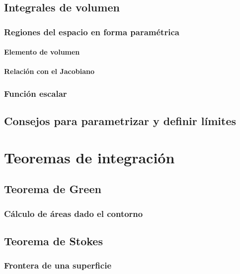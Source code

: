 \documentclass[12pt, fleqn]{report}                             %
\begin{document}
		\section{Integrales de volumen}
		
			\subsection{Regiones del espacio en forma paramétrica}
			
				\subsubsection{Elemento de volumen}
				
				\subsubsection{Relación con el Jacobiano}
		
			\subsection{Función escalar}
			
		\section{Consejos para parametrizar y definir límites}
	
	\chapter{Teoremas de integración}
	
		\section{Teorema de Green}
		
			\subsection{Cálculo de áreas dado el contorno}
		
		\section{Teorema de Stokes}
		
			\subsection{Frontera de una superficie}
		
\end{document}
